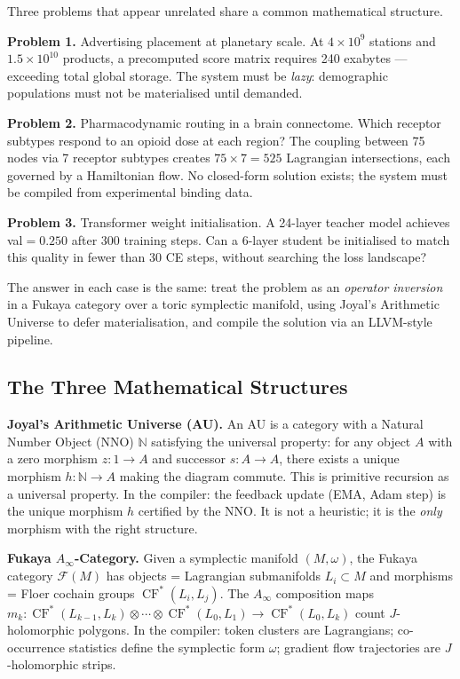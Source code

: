 \documentclass[11pt]{amsart}
\DeclareMathOperator{\CF}{CF}
\newcommand{\Fuk}{\mathcal{F}}
\begin{document}
Three problems that appear unrelated share a common mathematical structure.

\textbf{Problem 1.} Advertising placement at planetary scale.
At $4\times10^9$ stations and $1.5\times10^{10}$ products,
a precomputed score matrix requires 240 exabytes --- exceeding
total global storage. The system must be \emph{lazy}: demographic
populations must not be materialised until demanded.

\textbf{Problem 2.} Pharmacodynamic routing in a brain connectome.
Which receptor subtypes respond to an opioid dose at each region?
The coupling between 75 nodes via 7 receptor subtypes creates
$75 \times 7 = 525$ Lagrangian intersections, each governed by
a Hamiltonian flow. No closed-form solution exists; the system
must be compiled from experimental binding data.

\textbf{Problem 3.} Transformer weight initialisation.
A 24-layer teacher model achieves val${=}0.250$ after 300 training
steps. Can a 6-layer student be initialised to match this quality
in fewer than 30 CE steps, without searching the loss landscape?

The answer in each case is the same: treat the problem as
an \emph{operator inversion} in a Fukaya category over a
toric symplectic manifold, using Joyal's Arithmetic Universe
to defer materialisation, and compile the solution via
an LLVM-style pipeline.

\subsection{The Three Mathematical Structures}

\textbf{Joyal's Arithmetic Universe (AU).}
An AU is a category with a Natural Number Object (NNO) $\mathbb{N}$
satisfying the universal property: for any object $A$ with a zero
morphism $z: 1 \to A$ and successor $s: A \to A$, there exists a
unique morphism $h: \mathbb{N} \to A$ making the diagram commute.
This is primitive recursion as a universal property.
In the compiler: the feedback update (EMA, Adam step) is the
unique morphism $h$ certified by the NNO. It is not a heuristic;
it is the \emph{only} morphism with the right structure.

\textbf{Fukaya $A_\infty$-Category.}
Given a symplectic manifold $(M, \omega)$, the Fukaya category
$\Fuk(M)$ has objects = Lagrangian submanifolds $L_i \subset M$
and morphisms = Floer cochain groups $\CF^*(L_i, L_j)$.
The $A_\infty$ composition maps $m_k: \CF^*(L_{k-1},L_k) \otimes
\cdots \otimes \CF^*(L_0,L_1) \to \CF^*(L_0,L_k)$ count
$J$-holomorphic polygons.
In the compiler: token clusters are Lagrangians;
co-occurrence statistics define the symplectic form $\omega$;
gradient flow trajectories are $J$-holomorphic strips.
\end{document}
